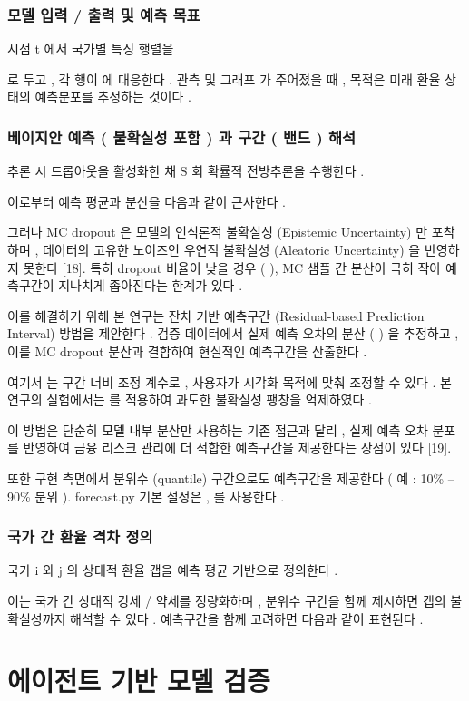 \documentclass[10pt,a4paper]{article}
\begin{document}
\subsubsection{모델 입력 / 출력 및 예측 목표}
시점 t 에서 국가별 특징 행렬을

로 두고 , 각 행이 에 대응한다 . 관측 및 그래프 가 주어졌을 때 , 목적은 미래 환율 상태의 예측분포를 추정하는 것이다 .

\subsubsection{베이지안 예측 ( 불확실성 포함 ) 과 구간 ( 밴드 ) 해석}
추론 시 드롭아웃을 활성화한 채 S 회 확률적 전방추론을 수행한다 .

이로부터 예측 평균과 분산을 다음과 같이 근사한다 .

그러나 MC dropout 은 모델의 인식론적 불확실성 (Epistemic Uncertainty) 만 포착하며 , 데이터의 고유한 노이즈인 우연적 불확실성 (Aleatoric Uncertainty) 을 반영하지 못한다 [18]. 특히 dropout 비율이 낮을 경우 ( ), MC 샘플 간 분산이 극히 작아 예측구간이 지나치게 좁아진다는 한계가 있다 .

이를 해결하기 위해 본 연구는 잔차 기반 예측구간 (Residual-based Prediction Interval) 방법을 제안한다 . 검증 데이터에서 실제 예측 오차의 분산 ( ) 을 추정하고 , 이를 MC dropout 분산과 결합하여 현실적인 예측구간을 산출한다 .

여기서 는 구간 너비 조정 계수로 , 사용자가 시각화 목적에 맞춰 조정할 수 있다 . 본 연구의 실험에서는 를 적용하여 과도한 불확실성 팽창을 억제하였다 .

이 방법은 단순히 모델 내부 분산만 사용하는 기존 접근과 달리 , 실제 예측 오차 분포를 반영하여 금융 리스크 관리에 더 적합한 예측구간을 제공한다는 장점이 있다 [19].

또한 구현 측면에서 분위수 (quantile) 구간으로도 예측구간을 제공한다 ( 예 : 10\% – 90\% 분위 ). forecast.py 기본 설정은 , 를 사용한다 .

\subsubsection{국가 간 환율 격차 정의}
국가 i 와 j 의 상대적 환율 갭을 예측 평균 기반으로 정의한다 .

이는 국가 간 상대적 강세 / 약세를 정량화하며 , 분위수 구간을 함께 제시하면 갭의 불확실성까지 해석할 수 있다 . 예측구간을 함께 고려하면 다음과 같이 표현된다 .

\section{에이전트 기반 모델 검증}
\end{document}

